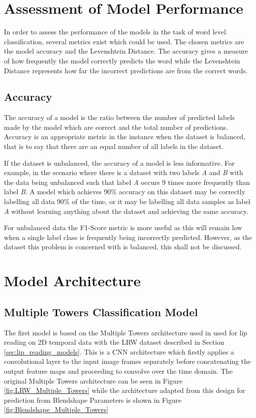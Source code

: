 \section{Assessment of Model Performance}\label{sec:class_assessment}
In order to assess the performance of the models in the task of word level classification, several metrics exist which could be used.
The chosen metrics are the model accuracy and the Levenshtein Distance.
The accuracy gives a measure of how frequently the model correctly predicts the word while the Levenshtein Distance represents how far the incorrect predictions are from the correct words.

\subsection{Accuracy}
The accuracy of a model is the ratio between the number of predicted labels made by the model which are correct and the total number of predictions.
Accuracy is an appropriate metric in the instance when the dataset is balanced, that is to say that there are an equal number of all labels in the dataset.

If the dataset is unbalanced, the accuracy of a model is less informative.
For example, in the scenario where there is a dataset with two labels \textit{A} and \textit{B} with the data being unbalanced such that label \textit{A} occurs 9 times more frequently than label \textit{B}.
A model which achieves 90\% accuracy on this dataset may be correctly labelling all data 90\% of the time, or it may be labelling all data samples as label \textit{A} without learning anything about the dataset and achieving the same accuracy.

For unbalanced data the F1-Score metric is more useful as this will remain low when a single label class is frequently being incorrectly predicted.
However, as the dataset this problem is concerned with is balanced, this shall not be discussed.

\section{Model Architecture}

\subsection{Multiple Towers Classification Model}\label{sec:multi_towers_model}
The first model is based on the Multiple Towers architecture used in \cite{Chung2016} used for lip reading on 2D temporal data with the LRW dataset described in Section \ref{sec:lip_reading_models}.
This is a CNN architecture which firstly applies a convolutional layer to the input image frames separately before concatenating the output feature maps and proceeding to convolve over the time domain.
The original Multiple Towers architecture can be seen in Figure \ref{fig:LRW_Multiple_Towers} while the architecture adapted from this design for prediction from Blendshape Parameters is shown in Figure \ref{fig:Blendshape_Multiple_Towers}

